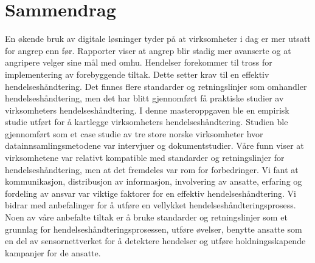 \chapter*{Sammendrag}
En \o kende bruk av digitale l\o sninger tyder p{\aa} at virksomheter i dag er mer utsatt for angrep enn f\o r. Rapporter viser at angrep blir stadig mer avanserte og at angripere velger sine m{\aa}l med omhu. Hendelser forekommer til tross for implementering av forebyggende tiltak. Dette setter krav til en effektiv hendelsesh{\aa}ndtering. Det finnes flere standarder og retningslinjer som omhandler hendelsesh{\aa}ndtering, men det har blitt gjennomf\o rt f{\aa} praktiske studier av virksomheters hendelsesh{\aa}ndtering. I denne masteroppgaven ble en empirisk studie utf\o rt for {\aa} kartlegge virksomheters hendelsesh{\aa}ndtering. Studien ble gjennomf\o rt som et case studie av tre store norske virksomheter hvor datainnsamlingsmetodene var intervjuer og dokumentstudier. V{\aa}re funn viser at virksomhetene var relativt kompatible med standarder og retningslinjer for hendelsesh{\aa}ndtering, men at det fremdeles var rom for forbedringer. Vi fant at kommunikasjon, distribusjon av informasjon, involvering av ansatte, erfaring og fordeling av ansvar var viktige faktorer for en effektiv hendelsesh{\aa}ndtering. Vi bidrar med anbefalinger for {\aa} utf\o re en vellykket hendelsesh{\aa}ndteringsprosess. Noen av v{\aa}re anbefalte tiltak er {\aa} bruke standarder og retningslinjer som et grunnlag for hendelsesh{\aa}ndteringsprosessen, utf\o re \o velser, benytte ansatte som en del av sensornettverket for {\aa} detektere hendelser og utf\o re holdningsskapende kampanjer for de ansatte.